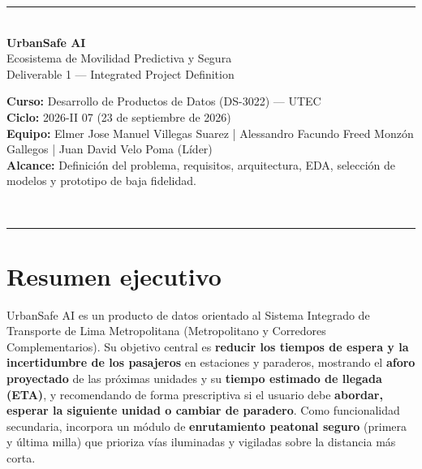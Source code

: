 \documentclass[11pt]{article}
\begin{document}
\begin{titlepage}
\centering
{\color{usblue}\rule{\textwidth}{2pt}}\\[0.6cm]
{\Huge\bfseries\color{usblue} UrbanSafe AI}\\[0.35cm]
{\LARGE Ecosistema de Movilidad Predictiva y Segura}\\[0.25cm]
{\large\color{usgrey} Deliverable 1 --- Integrated Project Definition}\\[2.1cm]

\begin{minipage}{0.8\textwidth}
\centering
{\bfseries Curso:} Desarrollo de Productos de Datos (DS-3022) --- UTEC\\[2pt]
{\bfseries Ciclo:} 2026-II \quad\textbar{} 07 (23 de septiembre de 2026)\\[2pt]
{\bfseries Equipo:} Elmer Jose Manuel Villegas Suarez | Alessandro Facundo Freed Monzón Gallegos | Juan David Velo Poma (Líder)\\[8pt]
{\bfseries Alcance:} Definición del problema, requisitos, arquitectura, EDA, selección de modelos y prototipo de baja fidelidad.
\end{minipage}\\[1.8cm]

{\color{usblue}\rule{\textwidth}{2pt}}
\end{titlepage}

\tableofcontents
\newpage

\section{Resumen ejecutivo}
\label{sec:resumen}
UrbanSafe AI es un producto de datos orientado al Sistema Integrado de Transporte de Lima
Metropolitana (Metropolitano y Corredores Complementarios). Su objetivo central es \textbf{reducir
los tiempos de espera y la incertidumbre de los pasajeros} en estaciones y paraderos, mostrando el
\textbf{aforo proyectado} de las próximas unidades y su \textbf{tiempo estimado de llegada (ETA)},
y recomendando de forma prescriptiva si el usuario debe \textbf{abordar, esperar la siguiente unidad
o cambiar de paradero}. Como funcionalidad secundaria, incorpora un módulo de \textbf{enrutamiento
peatonal seguro} (primera y última milla) que prioriza vías iluminadas y vigiladas sobre la
distancia más corta.
\end{document}
